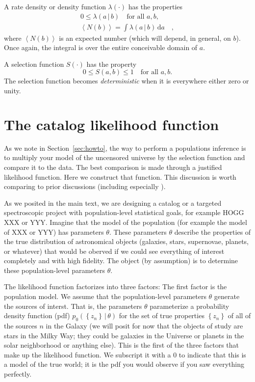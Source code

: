 \documentclass[modern]{aastex62}
\newcommand{\dd}{\mathrm{d}}
\newcommand{\given}{\,|\,}
\newcommand{\set}[1]{\left\{{#1}\right\}}
\newcommand{\sectionname}{Section}
\begin{document}
A rate density or density function $\lambda(\cdot)$ has the properties
\begin{gather}
                0 \leq   \lambda(a\given b)        \quad \mbox{for all $a, b$,} \\
\left<N(b)\right> = \int \lambda(a\given b)\,\dd a \quad,
\end{gather}
where $\left<N(b)\right>$ is an expected number
(which will depend, in general, on $b$). Once again, the integral
is over the entire conceivable domain of $a$.

A selection function $S(\cdot)$ has the property
\begin{equation}
0\leq S(a, b)\leq 1 \quad \mbox{for all $a, b$.}
\end{equation}
The selection function becomes \emph{deterministic} when it is
everywhere either zero or unity.

\section{The catalog likelihood function}\label{app:lf}

As we note in \sectionname~\ref{sec:howto}, the way to perform a populations
inference is to multiply your model of the uncensored universe by the
selection function and compare it to the data.
The best comparison is made through a justified likelihood function.
Here we construct that function.
This discussion is worth comparing to prior discussions (including
especially \citealt{marshall, loredo, bovy, exopop, mfg}).

As we posited in the main text, we are designing a catalog or a targeted
spectroscopic project
with population-level statistical goals, for example HOGG XXX or YYY.
Imagine that the model of the population (for example the model
of XXX or YYY) has parameters $\theta$.
These parameters $\theta$ describe the properties of the true distribution
of astronomical objects (galaxies, stars, supernovae, planets, or whatever)
that would be oberved if we could see everything of interest completely and
with high fidelity.
The object (by assumption) is to determine these population-level parameters
$\theta$.

The likelihood function factorizes into three factors:
The first factor is the population model.
We assume that the population-level parameters $\theta$ generate the
sources of interst.
That is, the parameters $\theta$ parameterize a probability density
function (pdf) $p_0(\set{z_n}\given\theta)$
for the set of true properties $\set{z_n}$ of all of the sources $n$
in the Galaxy (we will posit for now that the objects of study are
stars in the Milky Way; they could be galaxies in the Universe or
planets in the solar neighborhood or anything else).
This is the first of the three factors that make up the likelihood
function.
We subscript it with a $0$ to indicate that
this is a model of the true world;
it is the pdf you would observe if you saw everything perfectly.
\end{document}
